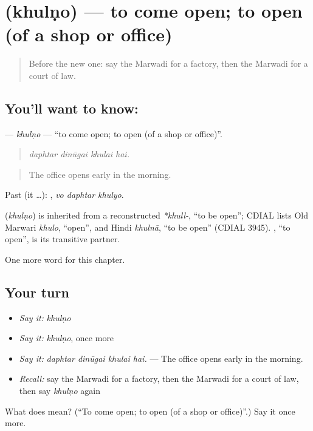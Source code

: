\section[\texorpdfstring{\mw{खुलणो} (khulṇo)}{खुलणो (khulṇo)}]{ (khulṇo) — to come open; to open (of a shop or office)}

\label{lesson:MW-C208-khulno}



\begin{quote}
Before the new one: say the Marwadi for a factory, then the Marwadi for a court of law.
\end{quote}

\subsection*{You'll want to know: }
\textbf{} — \emph{khulṇo} — \textquotedblleft{}to come open; to open (of a shop or office)\textquotedblright{}.

\begin{quote}
   
\end{quote}

\begin{quote}
\emph{daphtar dinūgai khulai hai.}
\end{quote}

\begin{quote}
The office opens early in the morning.
\end{quote}

Past (it …):   , \emph{vo daphtar khulyo}.

\begin{cousinweb}
\textbf{} (\emph{khulṇo}) is inherited from a reconstructed \emph{*khull-}, \textquotedblleft{}to be open\textquotedblright{}; CDIAL lists Old Marwari \emph{khulo}, \textquotedblleft{}open\textquotedblright{}, and Hindi \emph{khulnā}, \textquotedblleft{}to be open\textquotedblright{} (CDIAL 3945). \textbf{}, \textquotedblleft{}to open\textquotedblright{}, is its transitive partner.
\end{cousinweb}

\begin{grammarlens}[title={What you've built}]
One more word for this chapter.
\end{grammarlens}

\subsection*{Your turn}
\begin{itemize}
\raggedright
  \item \emph{Say it:} \emph{khulṇo}
  \item \emph{Say it:} \emph{khulṇo}, once more
  \item \emph{Say it:} \emph{daphtar dinūgai khulai hai.} — The office opens early in the morning.
  \item \emph{Recall:} say the Marwadi for a factory, then the Marwadi for a court of law, then say \emph{khulṇo} again
\end{itemize}

\begin{tcolorbox}[breakable,colback=teal!4,colframe=teal!35!black,title={Before you move on}]
What does  mean? (\textquotedblleft{}To come open; to open (of a shop or office)\textquotedblright{}.) Say it once more.
\end{tcolorbox}
